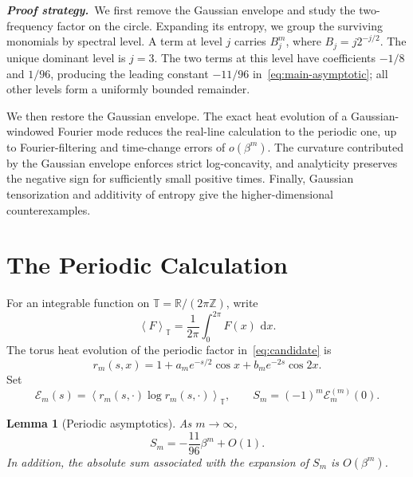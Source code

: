 \documentclass[10pt,letterpaper,journal]{IEEEtran}
\newcommand{\R}{\mathbb{R}}
\newcommand{\T}{\mathbb{T}}
\newcommand{\Z}{\mathbb{Z}}
\newcommand{\cE}{\mathcal{E}}
\newcommand{\dd}{\,\mathrm{d}}
\newcommand{\avgT}[1]{\left\langle #1\right\rangle_{\T}}
\theoremstyle{plain}
\newtheorem{lemma}[theorem]{Lemma}
\theoremstyle{definition}
\begin{document}
\noindent\textbf{\textit{Proof strategy.}}\ 
We first remove the Gaussian envelope and study the two-frequency factor on
the circle. Expanding its entropy, we group the surviving monomials by spectral
level. A term at level $j$ carries $B_j^m$, where $B_j=j2^{-j/2}$. The unique
dominant level is $j=3$. The two terms at this level have coefficients $-1/8$
and $1/96$, producing the leading constant $-11/96$
in~\eqref{eq:main-asymptotic}; all other levels form a uniformly bounded
remainder.

We then restore the Gaussian envelope. The exact heat evolution of a
Gaussian-windowed Fourier mode reduces the real-line calculation to the
periodic one, up to Fourier-filtering and time-change errors of
$o(\beta^m)$. The curvature contributed by the Gaussian envelope enforces
strict log-concavity, and analyticity preserves the negative sign for
sufficiently small positive times. Finally, Gaussian tensorization and
additivity of entropy give the higher-dimensional counterexamples.

\section{The Periodic Calculation}
\label{sec:periodic}

For an integrable function on $\T=\R/(2\pi\Z)$, write
\[
 \avgT{F}=\frac1{2\pi}\int_0^{2\pi}F(x)\,\dd x.
\]
The torus heat evolution of the periodic factor in~\eqref{eq:candidate} is
\begin{equation}
 r_m(s,x)=1+a_me^{-s/2}\cos x+b_me^{-2s}\cos2x.
 \label{eq:periodic-profile}
\end{equation}
Set
\begin{equation}
 \cE_m(s)=\avgT{r_m(s,\cdot)\log r_m(s,\cdot)},
 \qquad S_m=(-1)^m\cE_m^{(m)}(0).
 \label{eq:periodic-entropy}
\end{equation}

\begin{lemma}[Periodic asymptotics]
\label{lem:periodic}
As $m\to\infty$,
\begin{equation}
 S_m=-\frac{11}{96}\beta^m+O(1).
 \label{eq:periodic-asymptotic}
\end{equation}
In addition, the absolute sum associated with the expansion of $S_m$ is
$O(\beta^m)$.
\end{lemma}
\end{document}
